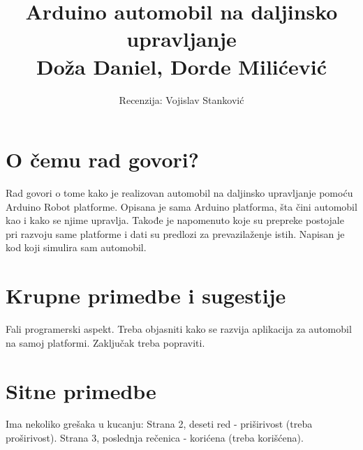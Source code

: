 \documentclass[a4paper]{article}
\begin{document}
	
	\title{Arduino automobil na daljinsko upravljanje\\ \small{Doža Daniel, Dorde Milićević}}
	
	\author{Recenzija: Vojislav Stanković}
	
	
	\maketitle
	
	
	
	
	\section{O čemu rad govori?}
	Rad govori o tome kako je realizovan automobil na daljinsko upravljanje pomoću Arduino Robot platforme.
	Opisana je sama Arduino platforma, šta čini automobil kao i kako se njime upravlja.
	Takođe je napomenuto koje su prepreke postojale pri razvoju same platforme i dati su predlozi za prevazilaženje istih.
	Napisan je kod koji simulira sam automobil.
	
	\section{Krupne primedbe i sugestije}
	Fali programerski aspekt. Treba objasniti kako se razvija aplikacija za automobil na samoj platformi.
	Zaključak treba popraviti.
	
	\section{Sitne primedbe}
	Ima nekoliko grešaka u kucanju:
	Strana 2, deseti red - priširivost (treba proširivost).
	Strana 3, poslednja rečenica - korićena (treba korišćena).
	
\end{document}
